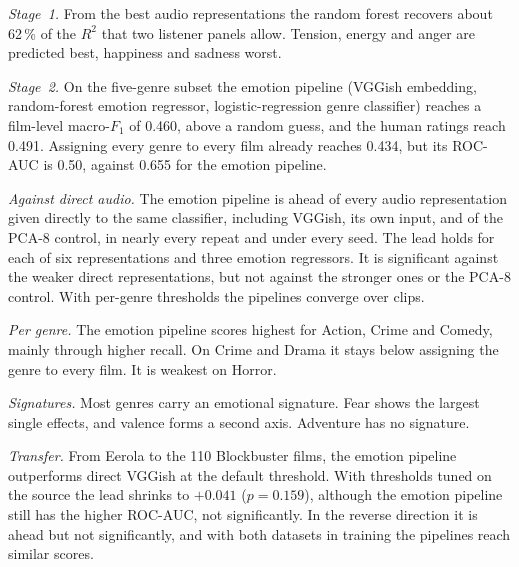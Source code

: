 \emph{Stage~1.} From the best audio representations the random forest recovers about
62\,\% of the $R^2$ that two listener panels allow. Tension, energy and anger are predicted best, happiness and sadness worst.

\emph{Stage~2.} On the five-genre subset the emotion pipeline (VGGish embedding,
random-forest emotion regressor, logistic-regression genre classifier) reaches a film-level macro-$F_1$ of 0.460, above a random guess, and the human ratings reach 0.491.
Assigning every genre to every film already reaches 0.434, but its ROC-AUC is 0.50,
against 0.655 for the emotion pipeline.

\emph{Against direct audio.} The emotion pipeline is ahead of every audio representation
given directly to the same classifier, including VGGish, its own input, and of the
PCA-8 control, in nearly every repeat and under every seed. The lead holds for each of six
representations and three emotion regressors. It is significant against the weaker direct
representations, but not against the stronger ones or the PCA-8 control. With per-genre thresholds the pipelines converge over clips.

\emph{Per genre.} The emotion pipeline scores highest for Action, Crime and Comedy,
mainly through higher recall. On Crime and Drama it stays below assigning the genre to every film. It is weakest on Horror.

\emph{Signatures.} Most genres carry an emotional signature. Fear shows the largest single effects, and valence forms a second axis. Adventure has no signature.

\emph{Transfer.} From Eerola to the 110 Blockbuster films, the emotion pipeline outperforms
direct VGGish at the default threshold. With thresholds tuned on the source the lead shrinks to $+0.041$ ($p=0.159$),
although the emotion pipeline still has the higher ROC-AUC, not significantly. In the reverse direction it is
ahead but not significantly, and with both datasets in training the pipelines reach similar scores.
